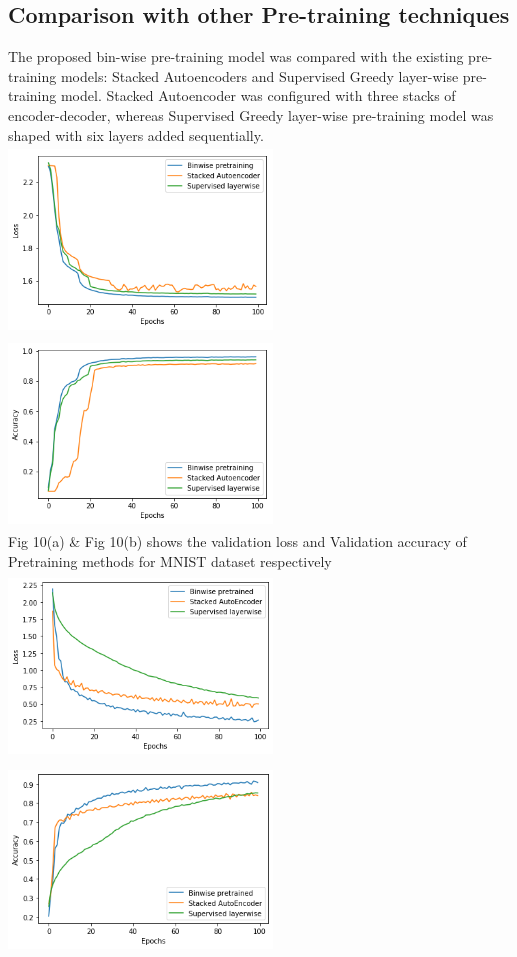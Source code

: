 \documentclass{article}
\begin{document}
\subsection{Comparison with other Pre-training techniques}
The proposed bin-wise pre-training model was compared with the existing pre-training
models: Stacked Autoencoders and Supervised Greedy layer-wise pre-training model.
Stacked Autoencoder was configured with three stacks of encoder-decoder, whereas
Supervised Greedy layer-wise pre-training model was shaped with six layers added
sequentially.
\\
\includegraphics[width= 7cm, height=5cm]{fig7.png}
\includegraphics[width= 7cm, height=5cm]{fig8.png}
\\
Fig 10(a) \& Fig 10(b) shows the validation loss and Validation accuracy of Pretraining methods for MNIST dataset respectively
\\
\includegraphics[width= 7cm, height=5cm]{fig9.png}
\includegraphics[width= 7cm, height=5cm]{fig10.png}
\end{document}
